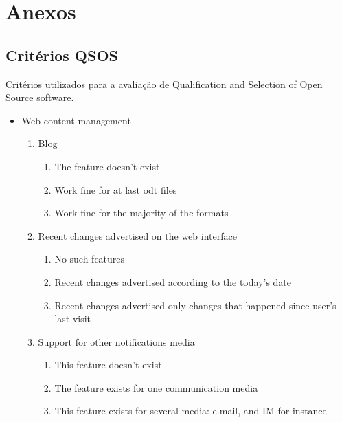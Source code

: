 \chapter{Anexos}

\section{Critérios QSOS}

Critérios utilizados para a avaliação de Qualification and Selection of Open Source software.

\begin{itemize}
    \item Web content management
    \begin{enumerate}
        \item Blog
            \begin{enumerate}
                \item The feature doesn't exist
                \item Work fine for at last odt files
                \item Work fine for the majority of the formats
            \end{enumerate}
        \item Recent changes advertised on the web interface
            \begin{enumerate}
                \item No such features
                \item Recent changes advertised according to the today's date
                \item Recent changes advertised only changes that happened since user's last visit
            \end{enumerate} 
        \item Support for other notifications media
            \begin{enumerate}
                \item This feature doesn't exist
                \item The feature exists for one communication media
                \item This feature exists for several media: e.mail, and IM for instance 
            \end{enumerate}               
    \end{enumerate}
    
\end{itemize}

